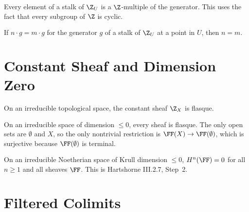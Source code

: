 \begin{lemma}\label{lem:stalk_zsmul_generator}
  \leanok
  Every element of a stalk of $\Z_U$ is a $\Z$-multiple of the generator.
  This uses the fact that every subgroup of $\Z$ is cyclic.
\end{lemma}

\begin{lemma}\label{lem:zsmul_generator_injective}
  \leanok
  If $n \cdot g = m \cdot g$ for the generator $g$ of a stalk of $\Z_U$
  at a point in $U$, then $n = m$.
\end{lemma}


\chapter{Constant Sheaf and Dimension Zero}\label{ch:dimzero}

\begin{theorem}\label{thm:constantSheaf_flasque}
  \leanok
  On an irreducible topological space, the constant sheaf $\Z_X$ is flasque.
\end{theorem}

\begin{lemma}\label{lem:sheaf_restriction_epi_dim_zero}
  \leanok
  On an irreducible space of dimension $\le 0$, every sheaf is flasque.
  The only open sets are $\emptyset$ and $X$, so the only nontrivial
  restriction is $\FF(X) \to \FF(\emptyset)$, which is surjective
  because $\FF(\emptyset)$ is terminal.
\end{lemma}

\begin{theorem}\label{thm:grothendieck_vanishing_dim_zero}
  \leanok
  On an irreducible Noetherian space of Krull dimension $\le 0$,
  $H^n(\FF) = 0$ for all $n \ge 1$ and all sheaves $\FF$.
  This is Hartshorne III.2.7, Step~2.
\end{theorem}


\chapter{Filtered Colimits}\label{ch:colimits}

